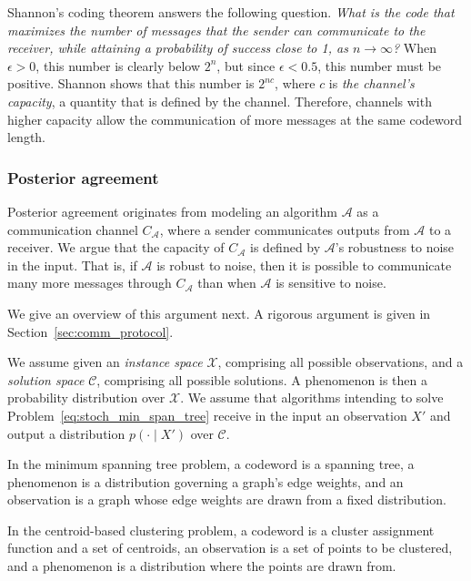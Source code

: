Shannon's coding theorem answers the following question. \emph{What is the code that maximizes the number of messages that the sender can communicate to the receiver, while attaining a probability of success close to 1, as $n \to \infty$?} When $\epsilon > 0$, this number is clearly below $2^n$, but since $\epsilon < 0.5$, this number must be positive. Shannon shows that this number is $2^{nc}$, where $c$ is \emph{the channel's capacity}, a quantity that is defined by the channel. Therefore, channels with higher capacity allow the communication of more messages at the same codeword length.

\subsubsection*{Posterior agreement}

Posterior agreement originates from modeling an algorithm $\mathcal{A}$ as a communication channel $C_{\mathcal{A}}$, where a sender communicates outputs from $\mathcal{A}$ to a receiver. We argue that the capacity of $C_{\mathcal{A}}$ is defined by $\mathcal{A}$'s robustness to noise in the input. That is, if $\mathcal{A}$ is robust to noise, then it is possible to communicate many more messages through $C_{\mathcal{A}}$ than when $\mathcal{A}$ is sensitive to noise.

We give an overview of this argument next. A rigorous argument is given in Section~\ref{sec:comm_protocol}.

We assume given an \emph{instance space} $\mathcal{X}$, comprising all possible observations, and a \emph{solution space} $\mathcal{C}$, comprising all possible solutions. A phenomenon is then a probability distribution over $\mathcal{X}$. We assume that algorithms intending to solve Problem~\ref{eq:stoch_min_span_tree} receive in the input an observation $X'$ and output a distribution $p(\cdot \mid X')$ over $\mathcal{C}$.

\begin{example} 
In the minimum spanning tree problem, a codeword is a spanning tree, a phenomenon is a distribution governing a graph's edge weights, and an observation is a graph whose edge weights are drawn from a fixed distribution. 
\end{example}

\begin{example}
In the centroid-based clustering problem, a codeword is a cluster assignment function and a set of centroids, an observation is a set of points to be clustered, and a phenomenon is a distribution where the points are drawn from.
\end{example}

